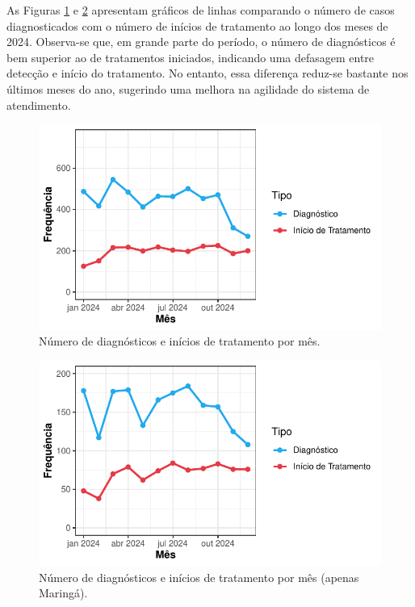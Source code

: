 \documentclass[a4paper]{modeloLEA} %
\begin{document}
\newpage

As Figuras \ref{fig:diagnostico1} e \ref{fig:diagmaringa} apresentam gráficos de linhas comparando o número de casos diagnosticados com o número de inícios de tratamento ao longo dos meses de 2024. Observa-se que, em grande parte do período, o número de diagnósticos é bem superior ao de tratamentos iniciados, indicando uma defasagem entre detecção e início do tratamento. No entanto, essa diferença reduz-se bastante nos últimos meses do ano, sugerindo uma melhora na agilidade do sistema de atendimento.

\begin{figure}[h]

{\centering \includegraphics{relatorio_files/figure-latex/diagnostico1-1} 

}

\caption{\label{fig:diagnostico1}Número de diagnósticos e inícios de tratamento por mês.}\label{fig:diagnostico1}
\end{figure}

\begin{figure}[h]

{\centering \includegraphics{relatorio_files/figure-latex/diagmaringa-1} 

}

\caption{\label{fig:diagmaringa}Número de diagnósticos e inícios de tratamento por mês (apenas Maringá).}\label{fig:diagmaringa}
\end{figure}
\end{document}
